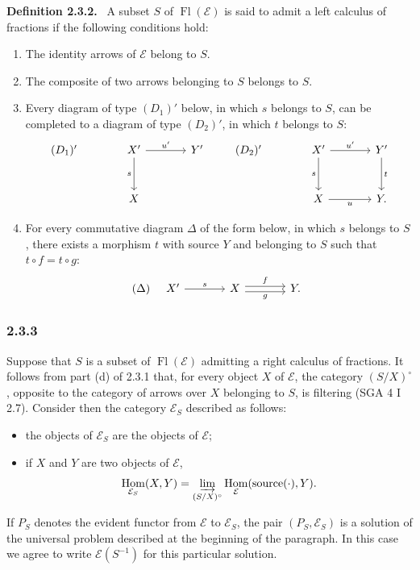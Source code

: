 \documentclass[11pt]{article}
\newenvironment{statement}[1]{\par\medskip\noindent\textbf{#1.}\ }{\par\medskip}
\DeclareMathOperator{\Hom}{Hom}
\providecommand{\Hom}{\operatorname{Hom}}
\providecommand{\Fl}{\operatorname{Fl}}
\providecommand{\cE}{\mathcal E}
\providecommand{\source}{\operatorname{source}}
\begin{document}
\begin{statement}{Definition 2.3.2}
A subset $S$ of $\Fl(\cE)$ is said to admit a left calculus of fractions if the following conditions hold:
\begin{enumerate}[label=(\alph*)]
\item[(a')] The identity arrows of $\cE$ belong to $S$.
\item[(b')] The composite of two arrows belonging to $S$ belongs to $S$.
\item[(c')] Every diagram of type $(D_1)'$ below, in which $s$ belongs to $S$, can be completed to a diagram of type $(D_2)'$, in which $t$ belongs to $S$:
\[
\begin{tikzcd}[column sep=large,row sep=large]
(D_1)'& X' \arrow[r,"u'"] \arrow[d,"s"'] & Y'\\
& X
\end{tikzcd}
\qquad
\begin{tikzcd}[column sep=large,row sep=large]
(D_2)'& X' \arrow[r,"u'"] \arrow[d,"s"'] & Y' \arrow[d,"t"]\\
& X \arrow[r,"u"'] & Y .
\end{tikzcd}
\]
\item[(d')] For every commutative diagram $\Delta$ of the form below, in which $s$ belongs to $S$, there exists a morphism $t$ with source $Y$ and belonging to $S$ such that $t\circ f=t\circ g$:
\[
(\Delta)\quad
\begin{tikzcd}[column sep=large]
X' \arrow[r,"s"] & X \arrow[r,shift left,"f"] \arrow[r,shift right,"g"'] & Y .
\end{tikzcd}
\]
\end{enumerate}
\end{statement}

\subsubsection*{2.3.3}
Suppose that $S$ is a subset of $\Fl(\cE)$ admitting a right calculus of fractions. It follows from part (d) of 2.3.1 that, for every object $X$ of $\cE$, the category $(S/X)^\circ$, opposite to the category of arrows over $X$ belonging to $S$, is filtering (SGA 4 I 2.7). Consider then the category $\cE_S$ described as follows:
\begin{itemize}
\item the objects of $\cE_S$ are the objects of $\cE$;
\item if $X$ and $Y$ are two objects of $\cE$,
\[
\Hom_{\cE_S}(X,Y)=\varinjlim_{(S/X)^\circ}\Hom_{\cE}(\source(\cdot),Y).
\]
\end{itemize}
If $P_S$ denotes the evident functor from $\cE$ to $\cE_S$, the pair $(P_S,\cE_S)$ is a solution of the universal problem described at the beginning of the paragraph. In this case we agree to write $\cE(S^{-1})$ for this particular solution.
\end{document}
